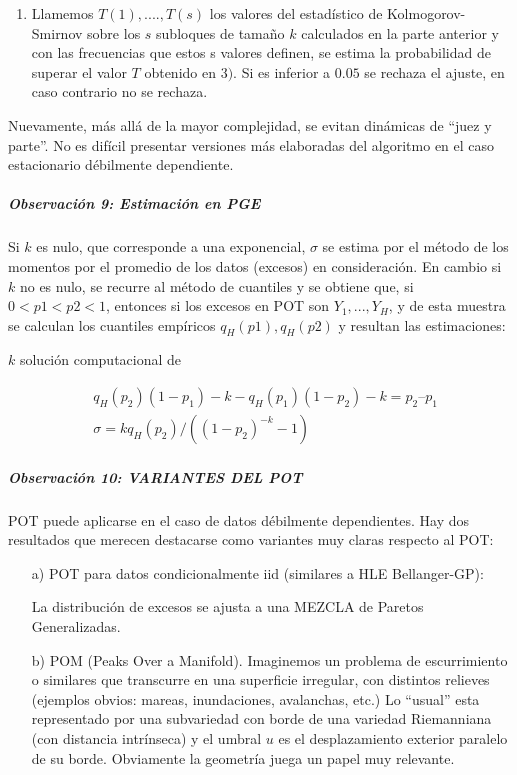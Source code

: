 \documentclass[
  12pt]{article}
\begin{document}
\begin{itemize}
\begin{enumerate}
\item Llamemos $T(1),....,T(s)$ los valores del estadístico de Kolmogorov-Smirnov sobre los $s$ subloques de tamaño $k$ calculados en la parte anterior y con las frecuencias que estos s valores definen, se estima la probabilidad de superar el valor $T$ obtenido en $3)$. Si es inferior a $0.05$ se rechaza el ajuste, en caso contrario no se rechaza.
\end{enumerate}
Nuevamente, más allá de la mayor complejidad, se evitan dinámicas de “juez y parte”. No es difícil presentar versiones más elaboradas del algoritmo en el caso estacionario débilmente dependiente.
\end{itemize}

\subparagraph{Observación 9: Estimación en
PGE}\label{observaciuxf3n-9-estimaciuxf3n-en-pge}

Si \(k\) es nulo, que corresponde a una exponencial, \(\sigma\) se
estima por el método de los momentos por el promedio de los datos
(excesos) en consideración. En cambio si \(k\) no es nulo, se recurre al
método de cuantiles y se obtiene que, si \(0<p1<p2<1\), entonces si los
excesos en POT son \(Y_1,...,Y_H\), y de esta muestra se calculan los
cuantiles empíricos \(q_H(p1), q_H(p2)\) y resultan las estimaciones:

\(k\) solución computacional de

\begin{align}
&q_H(p_2)(1-p_1)-k - q_H(p_1)(1-p_2)-k = p_2 – p_1\\
&\sigma= k q_H(p_2)/( (1-p_2)^{-k} -1)
\end{align}

\subparagraph{Observación 10: VARIANTES DEL
POT}\label{observaciuxf3n-10-variantes-del-pot}

POT puede aplicarse en el caso de datos débilmente dependientes. Hay dos
resultados que merecen destacarse como variantes muy claras respecto al
POT:

\begin{itemize}
\item[a)] POT para datos condicionalmente iid (similares a HLE Bellanger-GP):

La distribución de excesos se ajusta a una MEZCLA de Paretos Generalizadas.
\item[b)] POM (Peaks Over a Manifold).
Imaginemos un problema de escurrimiento o similares que transcurre en una superficie irregular, con distintos relieves (ejemplos obvios: mareas, inundaciones, avalanchas, etc.)
Lo “usual” esta representado por una subvariedad con borde de una variedad Riemanniana (con distancia intrínseca) y el umbral $u$ es el desplazamiento exterior paralelo de su borde. Obviamente la geometría juega un papel muy relevante. 
\end{itemize}
\end{document}
